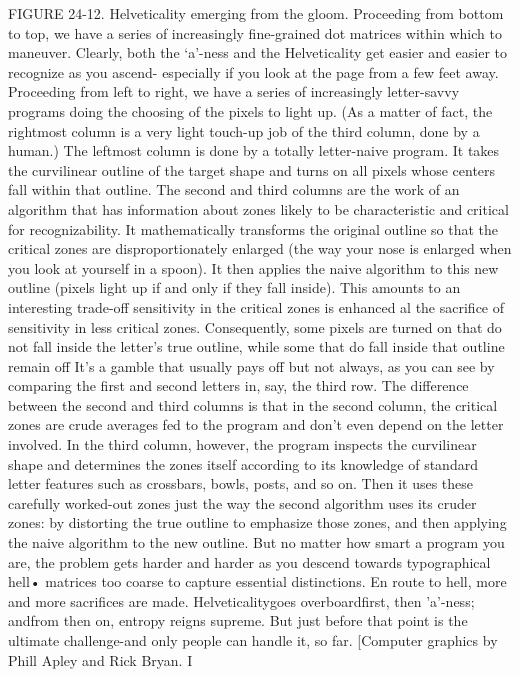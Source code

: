 FIGURE 24-12. Helveticality emerging from the gloom. Proceeding from bottom to top, we
have a series of increasingly fine-grained dot matrices within which to maneuver. Clearly,
both the `a'-ness and the Helveticality get easier and easier to recognize as you ascend-
especially if you look at the page from a few feet away. Proceeding from left to right, we have
a series of increasingly letter-savvy programs doing the choosing of the pixels to light up. (As
a matter of fact, the rightmost column is a very light touch-up job of the third column, done by
a human.)
          The leftmost column is done by a totally letter-naive program. It takes the curvilinear
outline of the target shape and turns on all pixels whose centers fall within that outline.
          The second and third columns are the work of an algorithm that has information
about zones likely to be characteristic and critical for recognizability. It mathematically
transforms the original outline so that the critical zones are disproportionately enlarged (the
way your nose is enlarged when you look at yourself in a spoon). It then applies the naive
algorithm to this new outline (pixels light up if and only if they fall inside). This amounts to an
interesting trade-off sensitivity in the critical zones is enhanced al the sacrifice of sensitivity
in less critical zones. Consequently, some pixels are turned on that do not fall inside the
letter's true outline, while some that do fall inside that outline remain off It's a gamble that
usually pays off but not always, as you can see by comparing the first and second letters in,
say, the third row.
          The difference between the second and third columns is that in the second column, the
critical zones are crude averages fed to the program and don't even depend on the letter
involved. In the third column, however, the program inspects the curvilinear shape and
determines the zones itself according to its knowledge of standard letter features such as
crossbars, bowls, posts, and so on. Then it uses these carefully worked-out zones just the way
the second algorithm uses its cruder zones: by distorting the true outline to emphasize those
zones, and then applying the naive algorithm to the new outline.
          But no matter how smart a program you are, the problem gets harder and harder as
you descend towards typographical hell• matrices too coarse to capture essential distinctions.
En route to hell, more and more sacrifices are made. Helveticalitygoes overboardfirst, then
'a'-ness; andfrom then on, entropy reigns supreme. But just before that point is the ultimate
challenge-and only people can handle it, so far. [Computer graphics by Phill Apley and Rick
Bryan. I




